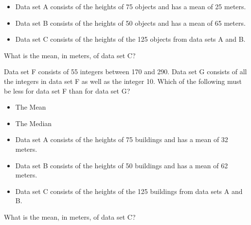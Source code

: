 \noindent\markforreview

\begin{itemize}


    \item Data set A consists of the heights of 75 objects and has a mean of 25 meters. 

    \item Data set B consists of the heights of 50 objects and has a mean of 65 meters.  

    \item Data set C consists of the heights of the 125 objects from data sets A and B.  
\end{itemize}
What is the mean, in meters, of data set C?

\vspace{2em}



\noindent\markforreview
\vspace{1em}

Data set F consists of 55 integers between 170 and 290. Data set G consists of all the integers in data set F as well as the integer 10.  
Which of the following must be less for data set F than for data set G?


\begin{itemize}
    \item[I.] The Mean
    \item[II.] The Median
\end{itemize}

\vspace{0.75em}


\vspace{2em}


\noindent\markforreview
\vspace{1em}
\begin{itemize}


    \item Data set A consists of the heights of 75 buildings and has a mean of 32 meters. 

    \item Data set B consists of the heights of 50 buildings and has a mean of 62 meters. 

    \item Data set C consists of the heights of the 125 buildings from data sets A and B.  
\end{itemize}
What is the mean, in meters, of data set C?




